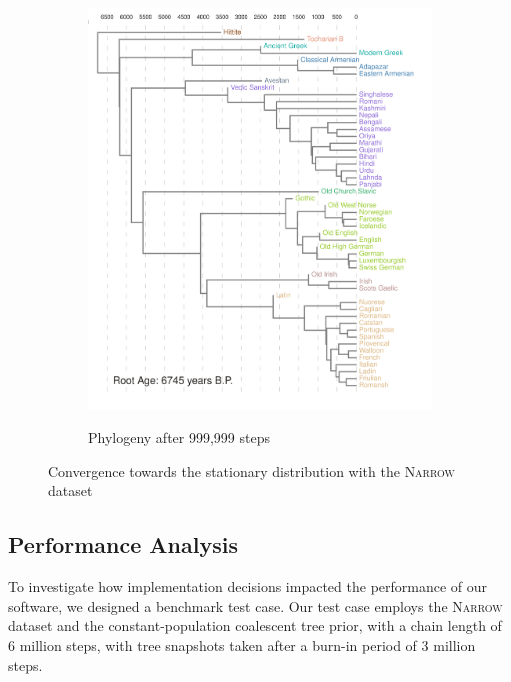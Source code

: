 \documentclass[10pt,journal,compsoc]{IEEEtran}
\begin{document}
\begin{figure}
\begin{subfigure}[b]{0.4\paperwidth}
         \label{fig:convtree3}
     \end{subfigure}
     \hfill
     \begin{subfigure}[b]{0.4\paperwidth}
         \centering
         \caption{Phylogeny after 999,999 steps}
         \includegraphics[width=\textwidth]{runs26-conv4}
         \label{fig:convtree4}
     \end{subfigure}
     \caption{Convergence towards the stationary distribution with the \textsc{Narrow} dataset}
     \label{fig:convtrees}
\end{figure}

\subsection{Performance Analysis}

To investigate how implementation decisions impacted the performance of our software, we designed a benchmark test case. Our test case employs the \textsc{Narrow} dataset and the constant-population coalescent tree prior, with a chain length of 6 million steps, with tree snapshots taken after a burn-in period of 3 million steps.
\end{document}
